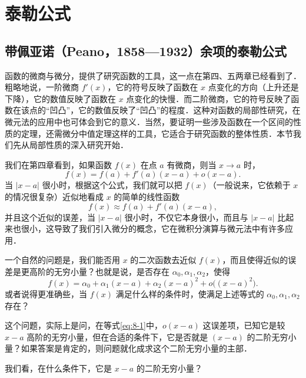 \section{泰勒公式}\label{sec:8-1}

\subsection{带佩亚诺（Peano，1858---1932）余项的泰勒公式}\label{subsec:8-1-1}

函数的微商与微分，提供了研究函数的工具，这一点在第四、五两章已经看到了．粗略地说，一阶微商 $f'(x)$，它的符号反映了函数在 $x$ 点变化的方向（上升还是下降），它的数值反映了函数在 $x$ 点变化的快慢．而二阶微商，它的符号反映了函数在该点的“凹凸”，它的数值反映了“凹凸”的程度．这种对函数的局部性研究，在微元法的应用中也可体会到它的意义．当然，要证明一些涉及函数在一个区间的性质的定理，还需微分中值定理这样的工具，它适合于研究函数的整体性质．本节我们先从局部性质的深入研究开始．

我们在第四章看到，如果函数 $f(x)$ 在点 $a$ 有微商，则当 $x \to a$ 时，
\begin{equation}\label{eq:8-1}
f(x) = f(a) + f'(a)(x-a) + o(x-a).
\end{equation}
当 $|x-a|$ 很小时，根据这个公式，我们就可以把 $f(x)$（一般说来，它依赖于 $x$ 的情况很复杂）近似地看成 $x$ 的简单的线性函数
\[
f(x) \approx f(a) + f'(a)(x-a),
\]
并且这个近似的误差，当 $|x-a|$ 很小时，不仅它本身很小，而且与 $|x-a|$ 比起来也很小，这导致了我们引入微分的概念，它在微积分演算与微元法中有许多应用．

一个自然的问题是，我们能否用 $x$ 的二次函数去近似 $f(x)$，而且使得近似的误差是更高阶的无穷小量？也就是说，是否存在 $\alpha_0, \alpha_1, \alpha_2$，使得
\[
f(x) = \alpha_0 + \alpha_1(x-a) + \alpha_2(x-a)^2 + o\big((x-a)^2\big).
\]
或者说得更准确些，当 $f(x)$ 满足什么样的条件时，使满足上述等式的 $\alpha_0, \alpha_1, \alpha_2$ 存在？

这个问题，实际上是问，在等式\eqref{eq:8-1}中，$o(x-a)$ 这误差项，已知它是较 $x-a$ 高阶的无穷小量，但在合适的条件下，它是否就是 $(x-a)$ 的二阶无穷小量？如果答案是肯定的，则问题就化成求这个二阶无穷小量的主部．

我们看，在什么条件下，它是 $x-a$ 的二阶无穷小量？

